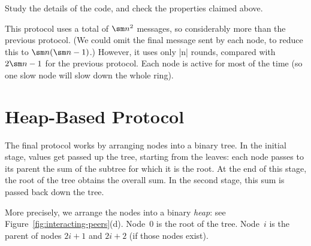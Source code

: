 \begin{instruction}
Study the details of the code, and check the properties claimed above.
\end{instruction}

This protocol uses a total of $\sm n^2$ messages, so considerably more than
the previous protocol.  (We could omit the final message sent by each node, to
reduce this to $\sm n(\sm n - 1)$.)  However, it uses only |n| rounds,
compared with $2\sm n-1$ for the previous protocol.  Each node is active for
most of the time (so one slow node will slow down the whole ring).


\section{Heap-Based Protocol}

The final protocol works by arranging nodes into a binary tree.  In the
initial stage, values get passed up the tree, starting from the leaves: each
node passes to its parent the sum of the subtree for which it is the root.  At
the end of this stage, the root of the tree obtains the overall sum.  In the
second stage, this sum is passed back down the tree.

More precisely, we arrange the nodes into a binary \emph{heap}: see
Figure~\ref{fig:interacting-peers}(d).  Node~$0$ is the root of the tree.
Node~$i$ is the parent of nodes $2i+1$ and $2i+2$ (if those nodes exist).





